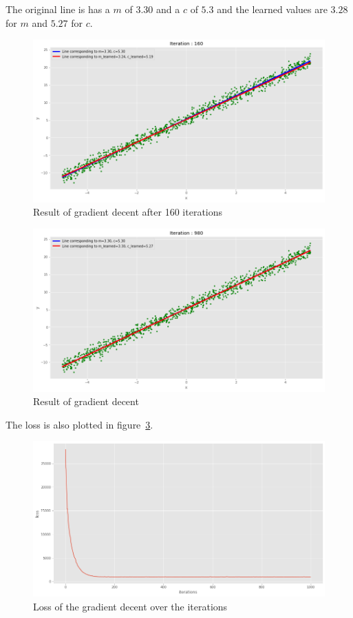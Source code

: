 The original line is has a $m$ of $3.30$ and a $c$ of $5.3$ and the learned values are $3.28$ for $m$ and $5.27$ for $c$.

\begin{figure}[h]
	\centering
    \includegraphics[width=17cm]{img/problem4_result_160.png}
	\caption{Result of gradient decent after 160 iterations}
    \label{problem4_result_160}
\end{figure}

\begin{figure}[h]
	\centering
    \includegraphics[width=17cm]{img/problem4_result.png}
	\caption{Result of gradient decent}
    \label{problem4_result}
\end{figure}

The loss is also plotted in figure~\ref{problem4_result_loss}.

\begin{figure}[h]
	\centering
    \includegraphics[width=17cm]{img/problem4_result_loss.png}
    \caption{Loss of the gradient decent over the iterations}
    \label{problem4_result_loss}
\end{figure}
